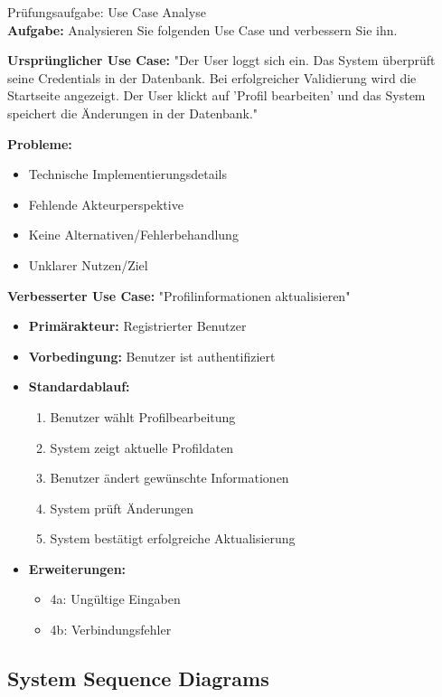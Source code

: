 \begin{example2}{Prüfungsaufgabe: Use Case Analyse}\\
\textbf{Aufgabe:} Analysieren Sie folgenden Use Case und verbessern Sie ihn.

\textbf{Ursprünglicher Use Case:}
"Der User loggt sich ein. Das System überprüft seine Credentials in der Datenbank. 
Bei erfolgreicher Validierung wird die Startseite angezeigt. Der User klickt auf 'Profil bearbeiten' 
und das System speichert die Änderungen in der Datenbank."

\textbf{Probleme:}
\begin{itemize}
    \item Technische Implementierungsdetails
    \item Fehlende Akteurperspektive
    \item Keine Alternativen/Fehlerbehandlung
    \item Unklarer Nutzen/Ziel
\end{itemize}

\textbf{Verbesserter Use Case:}
"Profilinformationen aktualisieren"
\begin{itemize}
    \item \textbf{Primärakteur:} Registrierter Benutzer
    \item \textbf{Vorbedingung:} Benutzer ist authentifiziert
    \item \textbf{Standardablauf:}
    \begin{enumerate}
        \item Benutzer wählt Profilbearbeitung
        \item System zeigt aktuelle Profildaten
        \item Benutzer ändert gewünschte Informationen
        \item System prüft Änderungen
        \item System bestätigt erfolgreiche Aktualisierung
    \end{enumerate}
    \item \textbf{Erweiterungen:}
    \begin{itemize}
        \item 4a: Ungültige Eingaben
        \item 4b: Verbindungsfehler
    \end{itemize}
\end{itemize}
\end{example2}


\columnbreak

\subsection{System Sequence Diagrams}

